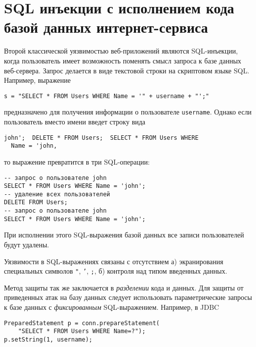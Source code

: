 \section[SQL инъекции с исполнением кода вебсервером]{SQL инъекции с исполнением кода \protect\\ базой данных интернет-сервиса}

Второй классической уязвимостью веб-приложений являются SQL-инъекции, когда пользователь имеет возможность поменять смысл запроса к базе данных веб-сервера. Запрос делается в виде текстовой строки на скриптовом языке SQL.  Например, выражение
\begin{verbatim}
s = "SELECT * FROM Users WHERE Name = '" + username + "';"
\end{verbatim}
предназначено для получения информации о пользователе \texttt{username}. Однако если пользователь вместо имени введет строку вида
\begin{center} \begin{verbatim}
john';  DELETE * FROM Users;  SELECT * FROM Users WHERE
  Name = 'john,
\end{verbatim} \end{center}
то выражение превратится в три SQL-операции:
\begin{verbatim}
-- запрос о пользователе john
SELECT * FROM Users WHERE Name = 'john';
-- удаление всех пользователей
DELETE FROM Users;
-- запрос о пользователе john
SELECT * FROM Users WHERE Name = 'john';
\end{verbatim}
При исполнении этого SQL-выражения базой данных все записи пользователей будут удалены.

Уязвимости в SQL-выражениях связаны с отсутствием а) экранирования специальных символов \texttt{"},  \texttt{'},  \texttt{;}, б) контроля над типом введенных данных.

Метод защиты так же заключается в \emph{разделении} кода и данных. Для защиты от приведенных атак на базу данных следует использовать параметрические запросы к базе данных с \emph{фиксированным} SQL-выражением. Например, в JDBC
\begin{verbatim}
PreparedStatement p = conn.prepareStatement(
    "SELECT * FROM Users WHERE Name=?");
p.setString(1, username);
\end{verbatim}
